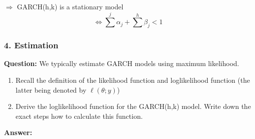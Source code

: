 \begin{footnotesize}
$\Rightarrow$ GARCH(h,k) is a stationary model 
\[ \Leftrightarrow \sum^j \alpha_j + \sum^h \beta_j < 1\]
 

\subsubsection*{4. Estimation}

\textbf{Question:} We typically estimate GARCH models using maximum likelihood. 
\begin{enumerate}
    \item Recall the definition of the likelihood function and loglikelihood function (the latter being denoted by $\ell(\theta;y)$)
    \item Derive the loglikelihood function for the GARCH(h,k) model. Write down the exact steps how to calculate this function.
\end{enumerate}

\textbf{Answer:} \\


\end{footnotesize}
